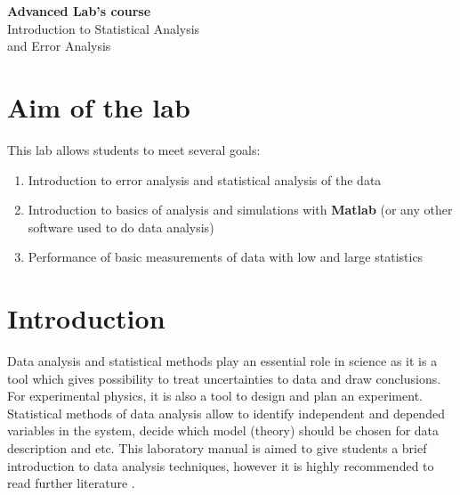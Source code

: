 \documentclass[12pt,a4paper]{report}
\begin{document}
\begin{center}
{\bf Advanced Lab's course} \\ %
Introduction to Statistical Analysis \\
and Error Analysis \\
\end{center}


\section{Aim of the lab}
This lab allows students to meet several goals:
\begin{enumerate}
\item Introduction to error analysis and statistical analysis of the data
\item Introduction to basics of analysis and simulations with \textbf{Matlab} (or any other software used to do data analysis)
\item Performance of basic measurements of data with low and large statistics
\end{enumerate}


\section{Introduction}
Data analysis and statistical methods play an essential role in science as it is a tool which gives possibility to treat uncertainties to data and draw conclusions. For experimental physics, it is also a tool to design and plan an experiment. Statistical methods of data analysis allow to identify independent and depended variables in the system, decide which model (theory) should be chosen for data description and etc. This laboratory manual is aimed to give students a brief introduction to data analysis techniques, however it is highly recommended to read further literature \cite{stat_1, stat_2, stat_3}.
\end{document}
